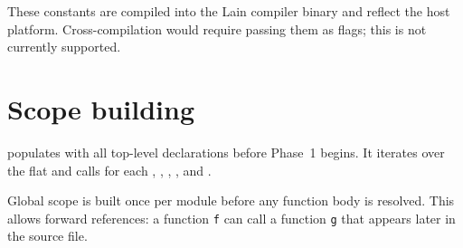 \pnum
These constants are compiled into the Lain compiler binary and reflect the
host platform.  Cross-compilation would require passing them as flags; this
is not currently supported.

\section{Scope building}
\label{sec:res-scopebuild}

\pnum
{} populates 
with all top-level declarations before Phase~1 begins.  It iterates over the
flat  and calls  for each
, , ,
, and .

\pnum
Global scope is built once per module before any function body is resolved.
This allows forward references: a function \texttt{f} can call a function
\texttt{g} that appears later in the source file.
